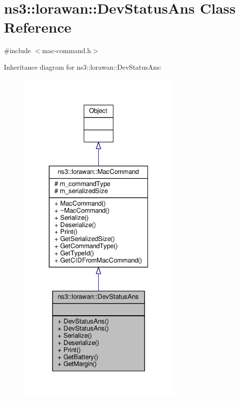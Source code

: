 \hypertarget{classns3_1_1lorawan_1_1DevStatusAns}{}\section{ns3\+:\+:lorawan\+:\+:Dev\+Status\+Ans Class Reference}
\label{classns3_1_1lorawan_1_1DevStatusAns}


{\ttfamily \#include $<$mac-\/command.\+h$>$}



Inheritance diagram for ns3\+:\+:lorawan\+:\+:Dev\+Status\+Ans\+:
\nopagebreak
\begin{figure}[H]
\begin{center}
\leavevmode
\includegraphics[width=232pt]{classns3_1_1lorawan_1_1DevStatusAns__inherit__graph}
\end{center}
\end{figure}


